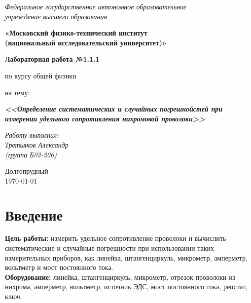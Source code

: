 


\author{Третьяков Александр}





	\begin{center}
		\textit{Федеральное государственное автономное образовательное\\ учреждение высшего образования }
		
		\vspace{0.5ex}
		
		\textbf{«Московский физико-технический институт\\ (национальный исследовательский университет)»}
	\end{center}
	
	\vspace{10ex}
	
	
	
		\begin{center}
		\vspace{13ex}
		
		\textbf{Лабораторная работа №1.1.1}
		
		\vspace{1ex}
		
		по курсу общей физики
		
		на тему:
		
		\textbf{\textit{<<Определение систематических и случайных погрешнойстей при измерении удельного сопротивления нихромовой проволоки>>}}
		
		\vspace{30ex}
		
		\begin{flushright}
			\noindent
			\textit{Работу выполнил:}\\  
			\textit{Третьяков Александр \\(группа Б02-206)}
		\end{flushright}
		\vfill
		Долгопрудный \\ \today
		
	\end{center}
	\newpage	
	
	
	\section{Введение}
	
	\textbf{Цель работы:} измерить удельное сопротивление проволоки и вычислить систематические и случайные погрешности при использовании таких измерительных приборов, как линейка, штангенциркуль, микрометр, амперметр, вольтметр и мост постоянного тока.
	\bigskip\\
	\textbf{Оборудование:} линейка, штангенциркуль, микрометр, отрезок проволоки из нихрома, амперметр, вольтметр, источник ЭДС, мост постоянного тока, реостат, ключ.
	

